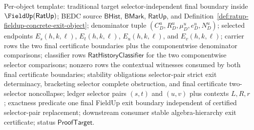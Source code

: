 Per-object template: traditional target selector-independent final boundary
inside $\FieldUp(\mathsf{RatUp})$; BEDC source $\mathsf{BHist}$,
$\mathsf{BMark}$, $\mathsf{RatUp}$, and
Definition~\ref{def:ratup-fieldup-concrete-exit-object}; denominator tuple
$(C_D^u,R_D^u,\mu_D^u,e_D^u,N_D^u)$; selected endpoints
$E_s(h,k,\ell)$, $E_t(h,k,\ell)$, $E_u(h,k,\ell)$, and
$E_v(h,k,\ell)$; carrier rows the two final certificate boundaries plus the
componentwise denominator comparisons; classifier rows
$\mathsf{RatHistoryClassifier}$ for the two componentwise selector comparisons;
nonzero rows the contextual witnesses consumed by both final certificate
boundaries; stability obligations selector-pair strict exit determinacy,
bracketing selector complete obstruction, and final certificate two-selector
noncollapse; ledger selector pairs $(s,t)$ and $(u,v)$ plus contexts $L,R,r$;
exactness predicate one final FieldUp exit boundary independent of certified
selector-pair replacement; downstream consumer stable algebra-hierarchy exit
certificate; status $\mathsf{ProofTarget}$.

